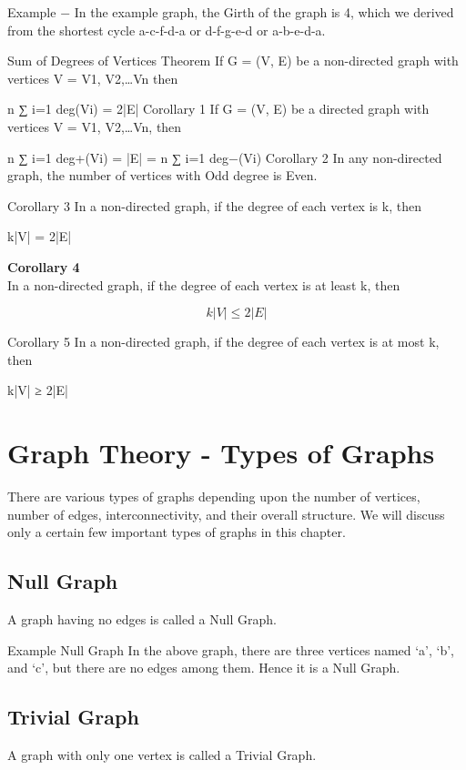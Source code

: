Example − In the example graph, the Girth of the graph is 4, which we derived from the shortest cycle a-c-f-d-a or d-f-g-e-d or a-b-e-d-a.

Sum of Degrees of Vertices Theorem
If G = (V, E) be a non-directed graph with vertices V = {V1, V2,…Vn} then

n
∑
i=1
 deg(Vi) = 2|E|
Corollary 1
If G = (V, E) be a directed graph with vertices V = {V1, V2,…Vn}, then

n
∑
i=1
 deg+(Vi) = |E| = 
n
∑
i=1
 deg−(Vi)
Corollary 2
In any non-directed graph, the number of vertices with Odd degree is Even.

Corollary 3
In a non-directed graph, if the degree of each vertex is k, then

k|V| = 2|E|

\textbf{Corollary 4}\\
In a non-directed graph, if the degree of each vertex is at least k, then

\[k|V| ≤ 2|E|\]

Corollary 5
In a non-directed graph, if the degree of each vertex is at most k, then

k|V| ≥ 2|E|



\section{Graph Theory - Types of Graphs}

 
There are various types of graphs depending upon the number of vertices, number of edges, interconnectivity, and their overall structure. We will discuss only a certain few important types of graphs in this chapter.

\subsection{Null Graph}
A graph having no edges is called a Null Graph.

Example
Null Graph
In the above graph, there are three vertices named ‘a’, ‘b’, and ‘c’, but there are no edges among them. Hence it is a Null Graph.

\subsection{Trivial Graph}
A graph with only one vertex is called a Trivial Graph.

